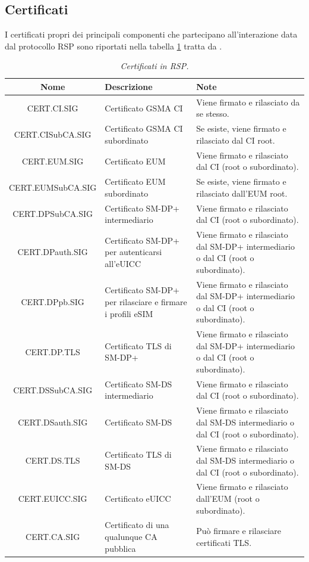 \documentclass[10pt, oneside]{book}
\begin{document}
\subsection{Certificati}
I certificati propri dei principali componenti che partecipano all'interazione data dal protocollo RSP sono riportati nella tabella \ref{tab:cert} tratta da \cite{GSMA-docs-new}.\\
\begin{table}[h!]
\begin{center}
\captionsetup{skip=4pt}
\caption{\textit{Certificati in RSP.}}
\label{tab:cert}
\begin{tabularx}{\textwidth}{|c|X|X|}
\hline
\textbf{Nome} & \textbf{Descrizione} & \textbf{Note}\\
\hline
CERT.CI.SIG & Certificato GSMA CI & Viene firmato e rilasciato da se stesso.\\
\hline
CERT.CISubCA.SIG & Certificato GSMA CI subordinato & Se esiste, viene firmato e rilasciato dal CI root.\\
\hline
CERT.EUM.SIG & Certificato EUM & Viene firmato e rilasciato dal CI (root o subordinato).\\
\hline
CERT.EUMSubCA.SIG & Certificato EUM subordinato & Se esiste, viene firmato e rilasciato dall'EUM root.\\
\hline
CERT.DPSubCA.SIG & Certificato SM-DP+ intermediario & Viene firmato e rilasciato dal CI (root o subordinato).\\
\hline
CERT.DPauth.SIG & Certificato SM-DP+ per autenticarsi all'eUICC & Viene firmato e rilasciato dal SM-DP+ intermediario o dal CI (root o subordinato).\\
\hline
CERT.DPpb.SIG & Certificato SM-DP+ per rilasciare e firmare i profili eSIM & Viene firmato e rilasciato dal SM-DP+ intermediario o dal CI (root o subordinato).\\
\hline
CERT.DP.TLS & Certificato TLS di SM-DP+ & Viene firmato e rilasciato dal SM-DP+ intermediario o dal CI (root o subordinato).\\
\hline
CERT.DSSubCA.SIG & Certificato SM-DS intermediario & Viene firmato e rilasciato dal CI (root o subordinato).\\
\hline
CERT.DSauth.SIG & Certificato SM-DS & Viene firmato e rilasciato dal SM-DS intermediario o dal CI (root o subordinato).\\
\hline
CERT.DS.TLS & Certificato TLS di SM-DS & Viene firmato e rilasciato dal SM-DS intermediario o dal CI (root o subordinato).\\
\hline
CERT.EUICC.SIG & Certificato eUICC & Viene firmato e rilasciato dall'EUM (root o subordinato).\\
\hline
CERT.CA.SIG & Certificato di una qualunque CA pubblica & Può firmare e rilasciare certificati TLS.\\
\hline
\end{tabularx}
\end{center}
\end{table}
\end{document}
